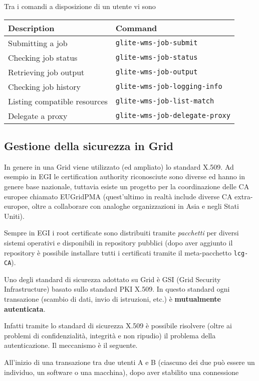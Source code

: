 \documentclass[italian,]{article}
\begin{document}
Tra i comandi a disposizione di un utente vi sono

\begin{longtable}[]{@{}ll@{}}
\toprule
\textbf{Description} & \textbf{Command}\tabularnewline
\midrule
\endhead
Submitting a job & \texttt{glite-wms-job-submit}\tabularnewline
Checking job status & \texttt{glite-wms-job-status}\tabularnewline
Retrieving job output & \texttt{glite-wms-job-output}\tabularnewline
Checking job history &
\texttt{glite-wms-job-logging-info}\tabularnewline
Listing compatible resources &
\texttt{glite-wms-job-list-match}\tabularnewline
Delegate a proxy & \texttt{glite-wms-job-delegate-proxy}\tabularnewline
\bottomrule
\end{longtable}

\subsection{Gestione della sicurezza in
Grid}\label{gestione-della-sicurezza-in-grid}

In genere in una Grid viene utilizzato (ed ampliato) lo standard X.509.
Ad esempio in EGI le certification authority riconosciute sono diverse
ed hanno in genere base nazionale, tuttavia esiste un progetto per la
coordinazione delle CA europee chiamato EUGridPMA (quest'ultimo in
realtà include diverse CA extra-europee, oltre a collaborare con
analoghe organizzazioni in Asia e negli Stati Uniti).

Sempre in EGI i root certificate sono distribuiti tramite
\emph{pacchetti} per diversi sistemi operativi e disponibili in
repository pubblici (dopo aver aggiunto il repository è possibile
installare tutti i certificati tramite il meta-pacchetto
\texttt{lcg-CA}).

Uno degli standard di sicurezza adottato su Grid è GSI (Grid Security
Infrastructure) basato sullo standard PKI X.509. In questo standard ogni
transazione (scambio di dati, invio di istruzioni, etc.) è
\textbf{mutualmente autenticata}.

Infatti tramite lo standard di sicurezza X.509 è possibile risolvere
(oltre ai problemi di confidenzialità, integrità e non ripudio) il
problema della autenticazione. Il meccanismo è il seguente.

All'inizio di una transazione tra due utenti A e B (ciascuno dei due può
essere un individuo, un software o una macchina), dopo aver stabilito
una connessione
\end{document}
